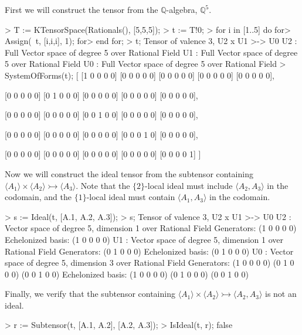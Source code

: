 \begin{example}[Ideals]

First we will construct the tensor from the $\mathbb{Q}$-algebra, $\mathbb{Q}^5$. 
\begin{code}
> T := KTensorSpace(Rationals(), [5,5,5]);
> t := T!0;
> for i in [1..5] do
for>   Assign(~t, [i,i,i], 1);
for> end for;
> t;
Tensor of valence 3, U2 x U1 >-> U0
U2 : Full Vector space of degree 5 over Rational Field
U1 : Full Vector space of degree 5 over Rational Field
U0 : Full Vector space of degree 5 over Rational Field
> SystemOfForms(t);
[
    [1 0 0 0 0]
    [0 0 0 0 0]
    [0 0 0 0 0]
    [0 0 0 0 0]
    [0 0 0 0 0],

    [0 0 0 0 0]
    [0 1 0 0 0]
    [0 0 0 0 0]
    [0 0 0 0 0]
    [0 0 0 0 0],

    [0 0 0 0 0]
    [0 0 0 0 0]
    [0 0 1 0 0]
    [0 0 0 0 0]
    [0 0 0 0 0],

    [0 0 0 0 0]
    [0 0 0 0 0]
    [0 0 0 0 0]
    [0 0 0 1 0]
    [0 0 0 0 0],

    [0 0 0 0 0]
    [0 0 0 0 0]
    [0 0 0 0 0]
    [0 0 0 0 0]
    [0 0 0 0 1]
]
\end{code}

Now we will construct the ideal tensor from the subtensor containing $\langle A_1\rangle \times \langle A_2\rangle \rightarrowtail \langle A_3\rangle$. 
Note that the $\{2\}$-local ideal must include $\langle A_2,A_3\rangle$ in the codomain, and the $\{1\}$-local ideal must contain $\langle A_1,A_3\rangle$ in the codomain. 
\begin{code}
> s := Ideal(t, [A.1, A.2, A.3]);
> s;
Tensor of valence 3, U2 x U1 >-> U0
U2 : Vector space of degree 5, dimension 1 over Rational Field
Generators:
(1 0 0 0 0)
Echelonized basis:
(1 0 0 0 0)
U1 : Vector space of degree 5, dimension 1 over Rational Field
Generators:
(0 1 0 0 0)
Echelonized basis:
(0 1 0 0 0)
U0 : Vector space of degree 5, dimension 3 over Rational Field
Generators:
(1 0 0 0 0)
(0 1 0 0 0)
(0 0 1 0 0)
Echelonized basis:
(1 0 0 0 0)
(0 1 0 0 0)
(0 0 1 0 0)
\end{code}

Finally, we verify that the subtensor containing $\langle A_1\rangle \times \langle A_2\rangle \rightarrowtail \langle A_2, A_3\rangle$ is not an ideal. 
\begin{code}
> r := Subtensor(t, [A.1, A.2], [A.2, A.3]);
> IsIdeal(t, r);
false
\end{code}
\end{example}

